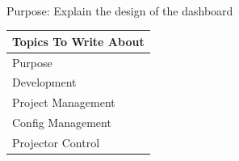 \label{sec:dashboardSection} \\
\begin{center}
	\textcolor{OliveGreen}{
		Purpose: Explain the design of the dashboard
	}
	
	\begin{table}[H]
		\centering
		\renewcommand\arraystretch{0.5}
		\begin{tabular}{|l|}
			\hline 
			Topics To Write About \\ 
			\hline 
			Purpose \\
			Development \\
			Project Management \\
			Config Management \\
			Projector Control \\
			\hline 
		\end{tabular}
	\end{table}
\end{center}

\clearpage
